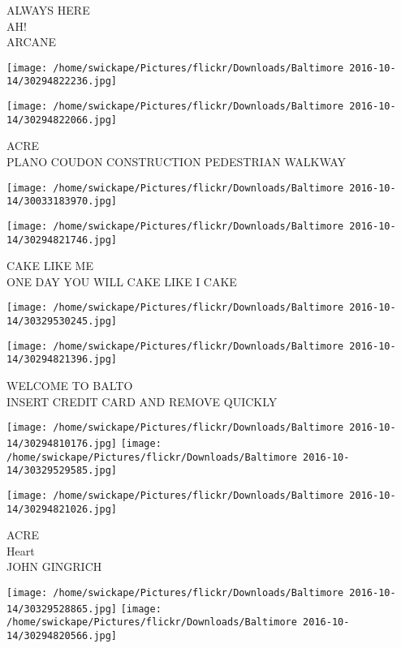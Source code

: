 \documentclass[10pt,letterpaper]{article}
\begin{document}
ALWAYS HERE\\
AH!\\
ARCANE
\pagebreak

\texttt{[image: /home/swickape/Pictures/flickr/Downloads/Baltimore 2016-10-14/30294822236.jpg]}

\vspace{0.25in}
\texttt{[image: /home/swickape/Pictures/flickr/Downloads/Baltimore 2016-10-14/30294822066.jpg]}

ACRE\\
PLANO COUDON CONSTRUCTION PEDESTRIAN WALKWAY
\pagebreak

\texttt{[image: /home/swickape/Pictures/flickr/Downloads/Baltimore 2016-10-14/30033183970.jpg]}

\vspace{0.25in}
\texttt{[image: /home/swickape/Pictures/flickr/Downloads/Baltimore 2016-10-14/30294821746.jpg]}

CAKE LIKE ME\\
ONE DAY YOU WILL CAKE LIKE I CAKE
\pagebreak

\texttt{[image: /home/swickape/Pictures/flickr/Downloads/Baltimore 2016-10-14/30329530245.jpg]}

\vspace{0.25in}
\texttt{[image: /home/swickape/Pictures/flickr/Downloads/Baltimore 2016-10-14/30294821396.jpg]}

WELCOME TO BALTO\\
INSERT CREDIT CARD AND REMOVE QUICKLY
\pagebreak

\texttt{[image: /home/swickape/Pictures/flickr/Downloads/Baltimore 2016-10-14/30294810176.jpg]}
\texttt{[image: /home/swickape/Pictures/flickr/Downloads/Baltimore 2016-10-14/30329529585.jpg]}

\vspace{0.25in}
\texttt{[image: /home/swickape/Pictures/flickr/Downloads/Baltimore 2016-10-14/30294821026.jpg]}

ACRE\\
Heart\\
JOHN GINGRICH
\pagebreak

\texttt{[image: /home/swickape/Pictures/flickr/Downloads/Baltimore 2016-10-14/30329528865.jpg]}
\texttt{[image: /home/swickape/Pictures/flickr/Downloads/Baltimore 2016-10-14/30294820566.jpg]}
\end{document}
